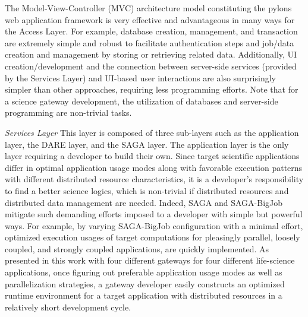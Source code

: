 \documentclass{sig-alternate}
\begin{document}
The Model-View-Controller (MVC) architecture model constituting the pylons web application framework is very effective and advantageous in many ways for the Access Layer. For example, database creation, management, and transaction are extremely simple and robust to facilitate authentication steps and job/data creation and management by storing or retrieving related data.  Additionally, UI creation/development and the connection between server-side services (provided by the Services Layer) and UI-based user interactions are also surprisingly simpler than other approaches, requiring less programming efforts.  Note that for a science gateway development, the utilization of databases and server-side programming are non-trivial tasks.         

\textit{Services Layer}
This layer is composed of three sub-layers such as the application layer, the DARE layer, and the SAGA layer.  The application layer is the only layer requiring a developer to build their own.  Since target scientific applications differ in optimal application usage modes along with favorable execution patterns with different distributed resource characteristics, it is a developer's responsibility to find a better science logics, which is non-trivial if distributed resources and distributed data management are needed.  Indeed, SAGA and SAGA-BigJob mitigate such demanding efforts imposed to a developer with simple but powerful ways.  For example, by varying SAGA-BigJob configuration with a minimal effort, optimized execution usages of target computations for pleasingly parallel, loosely coupled, and strongly coupled applications, are quickly implemented.  As presented in this work with four different gateways for four different life-science applications, once figuring out preferable application usage modes as well as parallelization strategies, a gateway developer easily constructs an optimized runtime environment for a target application with distributed resources in a relatively short development cycle.   


\end{document}
